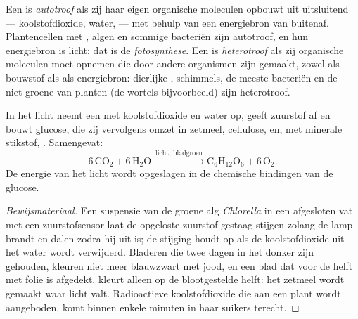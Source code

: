 \begin{definition}\label{def:g10:cell-metabolism:autotrophy}
Een  is \emph{autotroof} als zij haar eigen
organische moleculen opbouwt uit uitsluitend  ---
koolstofdioxide, water,  --- met behulp van een
energiebron van buitenaf. Plantencellen met , algen en
sommige bacteriën zijn autotroof, en hun energiebron is licht: dat is de
\emph{fotosynthese}. Een  is
\emph{heterotroof} als zij organische moleculen moet
opnemen die door andere organismen zijn gemaakt, zowel als bouwstof als
als energiebron: dierlijke , schimmels, de meeste bacteriën en de
niet-groene  van planten (de wortels bijvoorbeeld) zijn
heterotroof.
\end{definition}

\begin{proposition}[Fotosynthese]\label{prop:g10:cell-metabolism:photosynthesis}
In het licht neemt een  met  koolstofdioxide en water
op, geeft zuurstof af en bouwt glucose, die zij vervolgens omzet in
zetmeel, cellulose,  en, met minerale stikstof, .
Samengevat:
\[
6\,\mathrm{CO_2} + 6\,\mathrm{H_2O} \xrightarrow{\ \text{licht, bladgroen}\ }
\mathrm{C_6H_{12}O_6} + 6\,\mathrm{O_2}.
\]
De energie van het licht wordt opgeslagen in de chemische bindingen van de glucose.
\end{proposition}
\begin{proof}[Bewijsmateriaal]
Een suspensie van de groene alg \emph{Chlorella} in een afgesloten vat
met een zuurstofsensor laat de opgeloste zuurstof gestaag stijgen zolang
de lamp brandt en dalen zodra hij uit is; de stijging houdt op als de
koolstofdioxide uit het water wordt verwijderd. Bladeren die twee dagen
in het donker zijn gehouden, kleuren niet meer blauwzwart met jood, en
een blad dat voor de helft met folie is afgedekt, kleurt alleen op de
blootgestelde helft: het zetmeel wordt gemaakt waar licht valt.
Radioactieve koolstofdioxide die aan een plant wordt aangeboden, komt
binnen enkele minuten in haar suikers terecht.
\end{proof}

